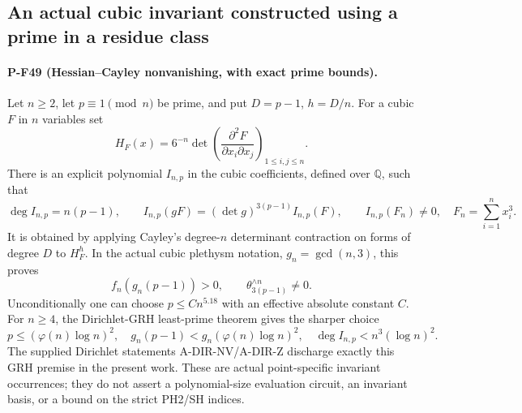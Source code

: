 \documentclass[11pt,a4paper]{article}
\begin{document}
\subsection{An actual cubic invariant constructed using a prime in a residue class}
\label{sec:hessian-fermat-prime}

\paragraph{P-F49 (Hessian--Cayley nonvanishing, with exact prime bounds).}
Let $n\ge2$, let $p\equiv1\pmod n$ be prime, and put
$D=p-1$, $h=D/n$. For a cubic $F$ in $n$ variables set
\[
       H_F(x)=6^{-n}\det\left(
                   \frac{\partial^2F}{\partial x_i\partial x_j}
                                      \right)_{1\le i,j\le n}.
                                                        \tag{P-F49a}
\]
There is an explicit polynomial $I_{n,p}$ in the cubic
coefficients, defined over $\mathbb Q$, such that
\[
 \deg I_{n,p}=n(p-1),\qquad
 I_{n,p}(gF)=(\det g)^{3(p-1)}I_{n,p}(F),\qquad
 I_{n,p}(F_n)\ne0,\quad F_n=\sum_{i=1}^n x_i^3.
                                                        \tag{P-F49b}
\]
It is obtained by applying Cayley's degree-$n$ determinant
contraction on forms of degree $D$ to $H_F^h$.
In the actual cubic plethysm notation, $g_n=\gcd(n,3)$,
this proves
\[
              f_n(g_n(p-1))>0,
           \qquad \theta_{3(p-1)}^{\wedge n}\ne0.
                                                        \tag{P-F49c}
\]
Unconditionally one can choose $p\le Cn^{5.18}$ with
an effective absolute constant $C$. For $n\ge4$, the
Dirichlet-GRH least-prime theorem gives the sharper choice
\[
      p\le(\varphi(n)\log n)^2,
      \quad g_n(p-1)<g_n(\varphi(n)\log n)^2,
      \quad\deg I_{n,p}<n^3(\log n)^2.                 \tag{P-F49d}
\]
The supplied Dirichlet statements A-DIR-NV/A-DIR-Z
discharge exactly this GRH premise in the present work.
These are actual point-specific invariant occurrences;
they do not assert a polynomial-size evaluation circuit,
an invariant basis, or a bound on the strict PH2/SH indices.
\end{document}
